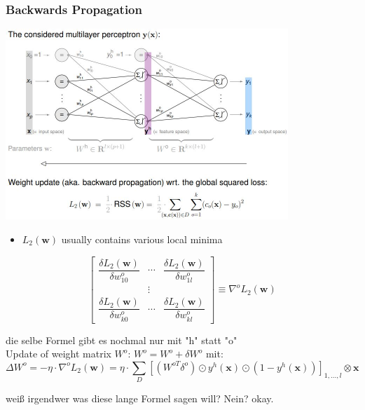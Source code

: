 \documentclass[11pt,a4paper]{article}
\begin{document}
\begin{flushleft}
\subsubsection{Backwards Propagation}
\includegraphics[width=0.8\textwidth]{BackwardProp}
\begin{itemize}
\item $L_2 (\textbf{w})$ usually contains various local minima
\end{itemize}
$$ \begin{bmatrix}
\dfrac{\delta L_2 (\textbf{w})}{\delta w^o_{10}} & \cdots & \dfrac{\delta L_2 (\textbf{w})}{\delta w^o_{1l}} \\
 & \vdots & \\
\dfrac{\delta L_2 (\textbf{w})}{\delta w^o_{k0}} & \cdots &  \dfrac{\delta L_2 (\textbf{w})}{\delta w^o_{kl}}
 \end{bmatrix} \equiv \nabla ^o L_2(\textbf{w}) $$

die selbe Formel gibt es nochmal nur mit "h" statt "o" \\
Update of weight matrix $W^o$: $W^o = W^o + \delta W^o $ mit: 
$$ \Delta W^o = - \eta \cdot \nabla ^o L_2(\textbf{w}) = \eta \cdot \displaystyle\sum_D  [(W^{oT} \delta ^o) \odot y^h (\textbf{x}) \odot (1 - y^h (\textbf{x}) )]_{1,...,l} \otimes \textbf{x} $$

weiß irgendwer was diese lange Formel sagen will? Nein? okay. 


\end{flushleft}
\end{document}
